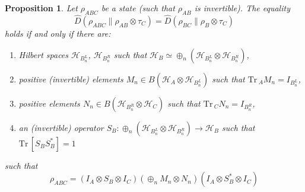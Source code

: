 \documentclass[12pt]{article}
\newtheorem{prop}{Proposition}
\theoremstyle{definition}
\theoremstyle{remark}
\def\Ha{\mathcal H}
\def \Tr{\mathrm{Tr}\,}
\begin{document}
\begin{prop} Let $\rho_{ABC}$ be a state (such that $\rho_{AB}$ is invertible). The equality
\begin{equation}\label{eq:eqm}
\hat D(\rho_{ABC}\|\rho_{AB}\otimes \tau_C)=\hat D(\rho_{BC}\|\rho_B\otimes  \tau_C)
\end{equation}
holds if and only if there are:
\begin{enumerate}
\item [(i)]Hilbert spaces $\Ha_{B^L_n}$, $\Ha_{B^R_n}$ such that 
$\Ha_B\simeq \oplus_n(\Ha_{B^L_n}\otimes \Ha_{B^R_n})$,
\item[(ii)] positive (invertible) elements $M_n\in B(\Ha_A\otimes \Ha_{B^L_n})$ such that
$\Tr_A M_n=I_{B^L_n}$,
\item [(iii)] positive elements $N_n\in B(\Ha_{B^R_n}\otimes \Ha_C)$ such that $\Tr_C
N_n=I_{B^R_n}$,
\item[(iv)] an (invertible) operator $S_B: \oplus_n (\Ha_{B^L_n}\otimes \Ha_{B^R_n})\to \Ha_B$ such
that $\Tr[S_BS_B^*]=1$
\end{enumerate}
such that
\[
\rho_{ABC}=(I_A\otimes S_B\otimes I_C)\left(\oplus_n M_n\otimes N_n \right)(I_A\otimes
S_B^*\otimes I_C)
\]

\end{prop}
\end{document}

